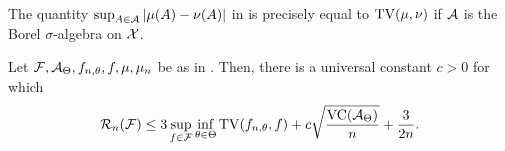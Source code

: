 \begin{rem}
  The quantity $\sup_{A \in \mathcal{A}} |\mu(A) - \nu(A)|$ in 
  is precisely equal to $\operatorname{TV}(\mu, \nu)$ if $\mathcal{A}$ is the Borel
  $\sigma$-algebra on $\mathcal{X}$.
\end{rem}

\begin{corr}
  Let $\mathcal{F}, \mathcal{A}_\Theta, f_{n, \theta}, f, \mu, \mu_n$ be as in
  . Then, there is a universal constant
  $c > 0$ for which
  \[
    \mathcal{R}_n(\mathcal{F}) \le 3 \sup_{f \in \mathcal{F}} \inf_{\theta \in \Theta} \operatorname{TV}(f_{n, \theta}, f) + c \sqrt{\frac{\operatorname{VC}(\mathcal{A}_\Theta)}{n}} + \frac{3}{2n} .
  \]
\end{corr}
